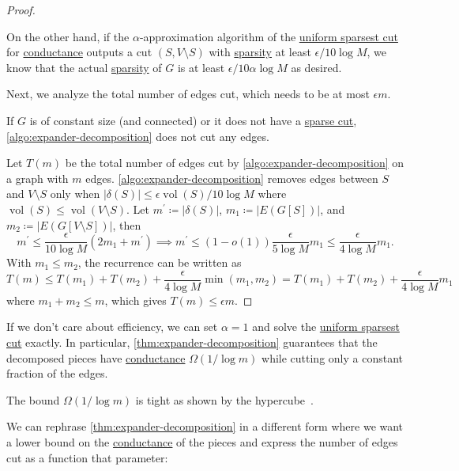 \begin{proof}
\begin{explanation}
		On the other hand, if the \(\alpha \)-approximation algorithm of the \hyperref[prb:sparsest-cut]{uniform sparsest cut} for \hyperref[def:conductance]{conductance} outputs a cut \((S, V\setminus S)\) with \hyperref[def:sparsity]{sparsity} at least \(\epsilon / 10\log M\), we know that the actual \hyperref[def:sparsity]{sparsity} of \(G\) is at least \(\epsilon / 10 \alpha \log M\) as desired.
	\end{explanation}

	Next, we analyze the total number of edges cut, which needs to be at most \(\epsilon m\).
	\begin{intuition}
		If \(G\) is of constant size (and connected) or it does not have a \hyperref[prb:sparsest-cut]{sparse cut}, \autoref{algo:expander-decomposition} does not cut any edges.
	\end{intuition}
	Let \(T(m)\) be the total number of edges cut by \autoref{algo:expander-decomposition} on a graph with \(m\) edges. \autoref{algo:expander-decomposition} removes edges between \(S\) and \(V\setminus S\) only when \(\lvert \delta (S) \rvert \leq \epsilon \operatorname{vol}(S) / 10 \log M \) where \(\operatorname{vol}(S) \leq \operatorname{vol}(V \setminus S) \). Let \(m^{\prime} \coloneqq \lvert \delta (S) \rvert \), \(m_1 \coloneqq \lvert E(G[S]) \rvert \), and \(m_2 \coloneqq \lvert E(G[V\setminus S]) \rvert\), then
	\[
		m^{\prime}
		\leq \frac{\epsilon }{10 \log M} (2m_1 + m^{\prime} )
		\implies m^{\prime} \leq (1 - o(1)) \frac{\epsilon }{5 \log M} m_1
		\leq \frac{\epsilon }{4 \log M} m_1.
	\]
	With \(m_1 \leq m_2\), the recurrence can be written as
	\[
		T(m)
		\leq T(m_1) + T(m_2) + \frac{\epsilon }{4 \log M} \min (m_1, m_2)
		= T(m_1) + T(m_2) + \frac{\epsilon }{4 \log M} m_1
	\]
	where \(m_1 + m_2 \leq m\), which gives \(T(m) \leq \epsilon m\).
\end{proof}

If we don't care about efficiency, we can set \(\alpha = 1\) and solve the \hyperref[prb:sparsest-cut]{uniform sparsest cut} exactly. In particular, \autoref{thm:expander-decomposition} guarantees that the decomposed pieces have \hyperref[def:conductance]{conductance} \(\Omega (1 / \log m)\) while cutting only a constant fraction of the edges.

\begin{note}
	The bound \(\Omega (1 / \log m)\) is tight as shown by the hypercube~\cite{alev2017graph}.
\end{note}

We can rephrase \autoref{thm:expander-decomposition} in a different form where we want a lower bound on the \hyperref[def:conductance]{conductance} of the pieces and express the number of edges cut as a function that parameter:

